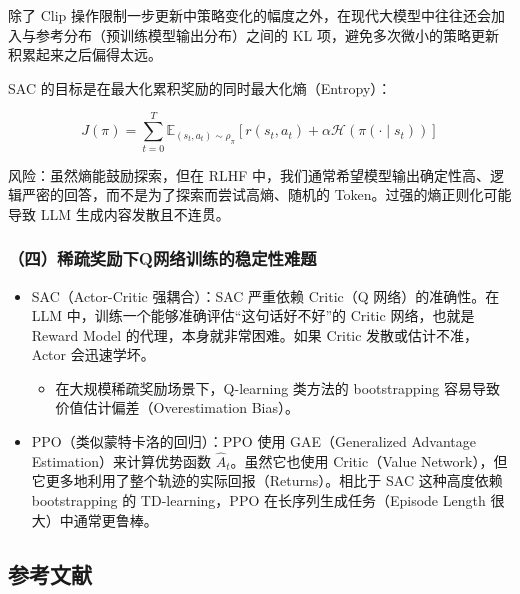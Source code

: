 除了 Clip 操作限制一步更新中策略变化的幅度之外，在现代大模型中往往还会加入与参考分布（预训练模型输出分布）之间的 KL 项，避免多次微小的策略更新积累起来之后偏得太远。

SAC 的目标是在最大化累积奖励的同时最大化熵（Entropy）：

\[
J(\pi)
=
\sum_{t=0}^{T}
\mathbb{E}_{(s_t,a_t)\sim\rho_\pi}
\left[
r(s_t,a_t)
+\alpha\mathcal{H}(\pi(\cdot\mid s_t))
\right]
\]

风险：虽然熵能鼓励探索，但在 RLHF 中，我们通常希望模型输出确定性高、逻辑严密的回答，而不是为了探索而尝试高熵、随机的 Token。过强的熵正则化可能导致 LLM 生成内容发散且不连贯。

\hypertarget{ux56dbux7a00ux758fux5956ux52b1ux4e0bqux7f51ux7edcux8badux7ec3ux7684ux7a33ux5b9aux6027ux96beux9898}{%
\subsubsection{（四）稀疏奖励下Q网络训练的稳定性难题}\label{ux56dbux7a00ux758fux5956ux52b1ux4e0bqux7f51ux7edcux8badux7ec3ux7684ux7a33ux5b9aux6027ux96beux9898}}

\begin{itemize}
\tightlist
\item
  SAC（Actor-Critic 强耦合）：SAC 严重依赖 Critic（Q 网络）的准确性。在 LLM 中，训练一个能够准确评估``这句话好不好''的 Critic 网络，也就是 Reward Model 的代理，本身就非常困难。如果 Critic 发散或估计不准，Actor 会迅速学坏。

  \begin{itemize}
  \tightlist
  \item
    在大规模稀疏奖励场景下，Q-learning 类方法的 bootstrapping 容易导致价值估计偏差（Overestimation Bias）。
  \end{itemize}
\item
  PPO（类似蒙特卡洛的回归）：PPO 使用 GAE（Generalized Advantage Estimation）来计算优势函数 \(\hat{A}_t\)。虽然它也使用 Critic（Value Network），但它更多地利用了整个轨迹的实际回报（Returns）。相比于 SAC 这种高度依赖 bootstrapping 的 TD-learning，PPO 在长序列生成任务（Episode Length 很大）中通常更鲁棒。
\end{itemize}

\FloatBarrier
{}
\hypertarget{ux53c2ux8003ux6587ux732e-84}{%
\subsection{参考文献}\label{ux53c2ux8003ux6587ux732e-84}}

